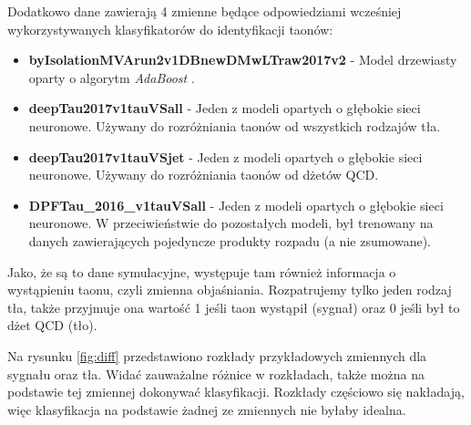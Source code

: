 \documentclass{pracalicmgr}
\begin{document}
	Dodatkowo dane zawierają 4 zmienne będące odpowiedziami wcześniej wykorzystywanych klasyfikatorów do identyfikacji taonów:
	\begin{itemize}
	\item \textbf{byIsolationMVArun2v1DBnewDMwLTraw2017v2} - Model drzewiasty oparty o algorytm \textit{AdaBoost} \cite{freund1997decision}.
	\item \textbf{deepTau2017v1tauVSall} - Jeden z modeli opartych o głębokie sieci neuronowe. Używany do rozróżniania taonów od wszystkich rodzajów tła.
	\item \textbf{deepTau2017v1tauVSjet} - Jeden z modeli opartych o głębokie sieci neuronowe. Używany do rozróżniania taonów od dżetów QCD.
	\item \textbf{DPFTau\_2016\_v1tauVSall} - Jeden z modeli opartych o głębokie sieci neuronowe. W przeciwieństwie do pozostałych modeli, był trenowany na danych zawierających pojedyncze produkty rozpadu (a nie zsumowane).
	\end{itemize}
	
	Jako, że są to dane symulacyjne, występuje tam również informacja o wystąpieniu taonu, czyli zmienna objaśniania. Rozpatrujemy tylko jeden rodzaj tła, także przyjmuje ona wartość 1 jeśli taon wystąpił (sygnał) oraz 0 jeśli był to dżet QCD (tło).
	
	Na rysunku \ref{fig:diff} przedstawiono rozkłady przykładowych zmiennych dla sygnału oraz tła. Widać zauważalne różnice w rozkładach, także można na podstawie tej zmiennej dokonywać klasyfikacji. Rozkłady częściowo się nakładają, więc klasyfikacja na podstawie żadnej ze zmiennych nie byłaby idealna.
	
\end{document}
